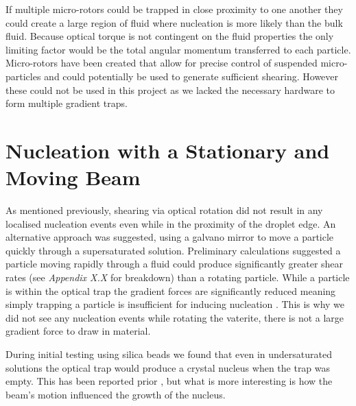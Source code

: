 If multiple micro-rotors could be trapped in close proximity 
to one another they could create a large region of fluid where 
nucleation is more likely than the bulk fluid. Because optical
torque is not contingent on the fluid properties the only 
limiting factor would be the total angular momentum transferred 
to each particle. Micro-rotors have been created that allow for 
precise control of suspended micro-particles \cite{Butaite2019} 
and could potentially be used to generate sufficient shearing. 
However these could not be used in this project as we lacked the 
necessary hardware to form multiple gradient traps.  
\section{Nucleation with a Stationary and Moving Beam}
As mentioned previously, shearing via optical rotation did 
not result in any localised nucleation events even while 
in the proximity of the droplet edge. An alternative approach
was suggested, using a galvano mirror to move a particle 
quickly through a supersaturated solution. Preliminary 
calculations suggested a particle moving rapidly through 
a fluid could produce significantly greater shear rates 
(see \emph{Appendix X.X} for breakdown) than a rotating 
particle. While a particle is within the optical trap the 
gradient forces are significantly reduced meaning simply 
trapping a particle is insufficient for inducing nucleation \cite{Flannigan2023}. This is why we did not see any 
nucleation events while rotating the vaterite, there is 
not a large gradient force to draw in material. 

During initial testing using silica beads we found that 
even in undersaturated solutions the optical trap would 
produce a crystal nucleus when the trap was empty. This 
has been reported prior \cite{Rungsimanon2010, Liao2022}, 
but what is more interesting is how the beam's motion 
influenced the growth of the nucleus. 


